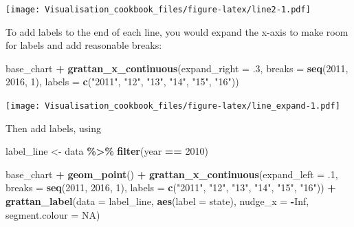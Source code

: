 \documentclass[
]{book}
\newenvironment{Shaded}{\begin{snugshade}}{\end{snugshade}}
\newcommand{\DataTypeTok}[1]{\textcolor[rgb]{0.13,0.29,0.53}{#1}}
\newcommand{\DecValTok}[1]{\textcolor[rgb]{0.00,0.00,0.81}{#1}}
\newcommand{\FloatTok}[1]{\textcolor[rgb]{0.00,0.00,0.81}{#1}}
\newcommand{\KeywordTok}[1]{\textcolor[rgb]{0.13,0.29,0.53}{\textbf{#1}}}
\newcommand{\NormalTok}[1]{#1}
\newcommand{\OperatorTok}[1]{\textcolor[rgb]{0.81,0.36,0.00}{\textbf{#1}}}
\newcommand{\OtherTok}[1]{\textcolor[rgb]{0.56,0.35,0.01}{#1}}
\newcommand{\StringTok}[1]{\textcolor[rgb]{0.31,0.60,0.02}{#1}}
\begin{document}
\texttt{[image: Visualisation\_cookbook\_files/figure-latex/line2-1.pdf]}

To add labels to the end of each line, you would expand the x-axis to make room for labels and add reasonable breaks:

\begin{Shaded}
\begin{Highlighting}[]
\NormalTok{base\_chart }\OperatorTok{+}
\StringTok{  }\KeywordTok{grattan\_x\_continuous}\NormalTok{(}\DataTypeTok{expand\_right =} \FloatTok{.3}\NormalTok{,}
                       \DataTypeTok{breaks =} \KeywordTok{seq}\NormalTok{(}\DecValTok{2011}\NormalTok{, }\DecValTok{2016}\NormalTok{, }\DecValTok{1}\NormalTok{),}
                       \DataTypeTok{labels =} \KeywordTok{c}\NormalTok{(}\StringTok{"2011"}\NormalTok{, }\StringTok{"12"}\NormalTok{, }\StringTok{"13"}\NormalTok{, }\StringTok{"14"}\NormalTok{, }\StringTok{"15"}\NormalTok{, }\StringTok{"16"}\NormalTok{)) }
\end{Highlighting}
\end{Shaded}

\texttt{[image: Visualisation\_cookbook\_files/figure-latex/line\_expand-1.pdf]}

Then add labels, using

\begin{Shaded}
\begin{Highlighting}[]
\NormalTok{label\_line \textless{}{-}}\StringTok{ }\NormalTok{data }\OperatorTok{\%\textgreater{}\%}\StringTok{ }
\StringTok{  }\KeywordTok{filter}\NormalTok{(year }\OperatorTok{==}\StringTok{ }\DecValTok{2010}\NormalTok{)}

\NormalTok{base\_chart }\OperatorTok{+}
\StringTok{  }\KeywordTok{geom\_point}\NormalTok{() }\OperatorTok{+}
\StringTok{  }\KeywordTok{grattan\_x\_continuous}\NormalTok{(}\DataTypeTok{expand\_left =} \FloatTok{.1}\NormalTok{,}
                       \DataTypeTok{breaks =} \KeywordTok{seq}\NormalTok{(}\DecValTok{2011}\NormalTok{, }\DecValTok{2016}\NormalTok{, }\DecValTok{1}\NormalTok{),}
                       \DataTypeTok{labels =} \KeywordTok{c}\NormalTok{(}\StringTok{"2011"}\NormalTok{, }\StringTok{"12"}\NormalTok{, }\StringTok{"13"}\NormalTok{, }\StringTok{"14"}\NormalTok{, }\StringTok{"15"}\NormalTok{, }\StringTok{"16"}\NormalTok{)) }\OperatorTok{+}\StringTok{ }
\StringTok{  }\KeywordTok{grattan\_label}\NormalTok{(}\DataTypeTok{data =}\NormalTok{ label\_line,}
                \KeywordTok{aes}\NormalTok{(}\DataTypeTok{label =}\NormalTok{ state),}
                \DataTypeTok{nudge\_x =} \OperatorTok{{-}}\OtherTok{Inf}\NormalTok{,}
                \DataTypeTok{segment.colour =} \OtherTok{NA}\NormalTok{)}
\end{Highlighting}
\end{Shaded}
\end{document}
